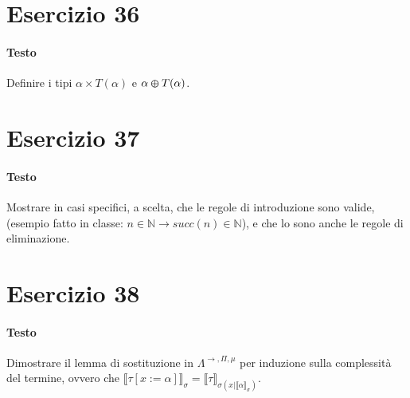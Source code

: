 \documentclass[a4paper,10pt]{article}
\begin{document}
\section*{Esercizio 36}
\paragraph{Testo}
Definire i tipi $\alpha \times T(\alpha)$ e $\alpha \varoplus T(\alpha)$.

\section*{Esercizio 37}
\paragraph{Testo}
Mostrare in casi specifici, a scelta, che le regole di introduzione sono valide, (esempio fatto in classe: $n \in \mathbb{N} \rightarrow succ(n) \in \mathbb{N}$), e che lo sono anche le regole di eliminazione.

\section*{Esercizio 38}
\paragraph{Testo}
Dimostrare il lemma di sostituzione in $\Lambda^{\rightarrow, \Pi, \mu}$ per induzione sulla complessità del termine, ovvero che $\llbracket \tau [x := \alpha]\rrbracket_\sigma = \llbracket \tau \rrbracket_{\sigma(x|\llbracket \alpha \rrbracket_\sigma)}$.
\end{document}
